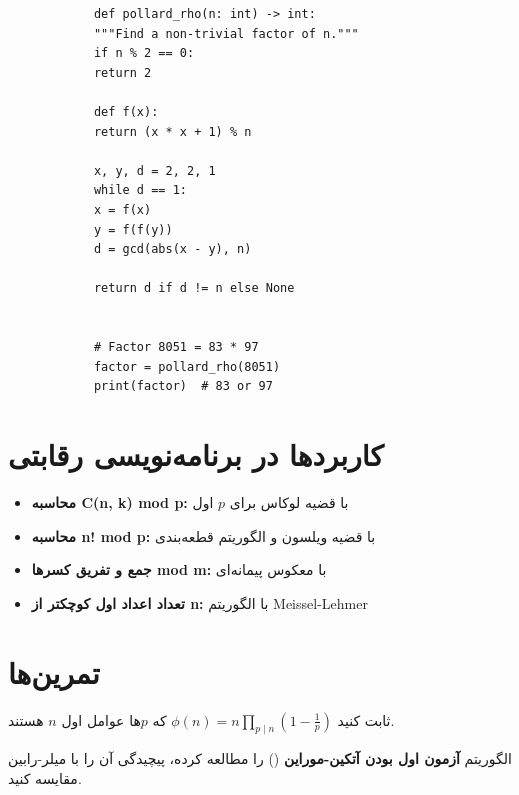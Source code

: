 \documentclass{matinbook}
\begin{document}
    \begin{latin}
        \begin{verbatim}
            def pollard_rho(n: int) -> int:
            """Find a non-trivial factor of n."""
            if n % 2 == 0:
            return 2
            
            def f(x):
            return (x * x + 1) % n
            
            x, y, d = 2, 2, 1
            while d == 1:
            x = f(x)
            y = f(f(y))
            d = gcd(abs(x - y), n)
            
            return d if d != n else None
            
            
            # Factor 8051 = 83 * 97
            factor = pollard_rho(8051)
            print(factor)  # 83 or 97
        \end{verbatim}
    \end{latin}
    \label{code:pollard-rho}
    
    \section{کاربردها در برنامه‌نویسی رقابتی}
    
    \begin{itemize}
        \item \textbf{محاسبه C(n, k) mod p:}
        با قضیه لوکاس برای $p$ اول
        \item \textbf{محاسبه n! mod p:}
        با قضیه ویلسون و الگوریتم قطعه‌بندی
        \item \textbf{جمع و تفریق کسرها mod m:}
        با معکوس پیمانه‌ای
        \item \textbf{تعداد اعداد اول کوچکتر از n:}
        با الگوریتم Meissel-Lehmer
    \end{itemize}
    
    \section{تمرین‌ها}
    
    \begin{exercise}
        ثابت کنید $\phi(n) = n \prod_{p \mid n} (1 - \frac{1}{p})$
        که $p$ها عوامل اول $n$ هستند.
        \label{exc:phi-formula}
    \end{exercise}
    
    \begin{exercise}
        الگوریتم \textbf{آزمون اول بودن آتکین-موراین}
        () را مطالعه کرده،
        پیچیدگی آن را با میلر-رابین مقایسه کنید.
        \label{exc:aks-vs-mr}
    \end{exercise}
    
\end{document}
